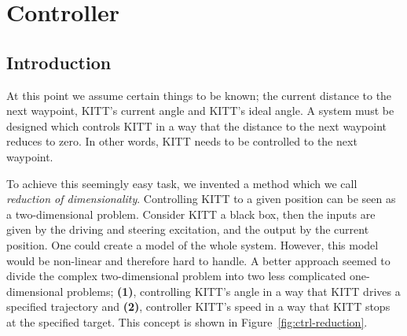 \documentclass[11pt,titlepage]{report}
\begin{document}
\chapter{Controller}
\label{ch:control}
\section{Introduction}
At this point we assume certain things to be known; the current distance to the next waypoint, KITT's current angle and KITT's ideal angle. A system must be designed which controls KITT in a way that the distance to the next waypoint reduces to zero. In other words, KITT needs to be controlled to the next waypoint.

To achieve this seemingly easy task, we invented a method which we call \textit{reduction of dimensionality}. Controlling KITT to a given position can be seen as a two-dimensional problem. Consider KITT a black box, then the inputs are given by the driving and steering excitation, and the output by the current position. One could create a model of the whole system. However, this model would be non-linear and therefore hard to handle. A better approach seemed to divide the complex two-dimensional problem into two less complicated one-dimensional problems; \textbf{(1)}, controlling KITT's angle in a way that KITT drives a specified trajectory and \textbf{(2)}, controller KITT's speed in a way that KITT stops at the specified target. This concept is shown in Figure~\ref{fig:ctrl-reduction}.
\end{document}
